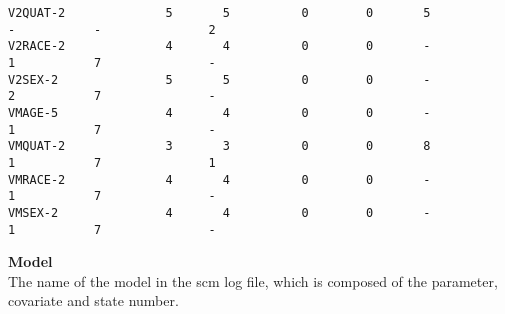 \documentclass[hideglossary,notoc,hidelof,hidelot,hideTheSignaturePage,hideLinkCurrent,hideloa,pdfLatex,noClient,notitle,hideConfidential]{PMXstyle-20170118kajsa4}
\begin{document}
{\begin{verbatim}
V2QUAT-2              5       5          0        0       5           -           -               2
V2RACE-2              4       4          0        0       -           1           7               -
V2SEX-2               5       5          0        0       -           2           7               -
VMAGE-5               4       4          0        0       -           1           7               -
VMQUAT-2              3       3          0        0       8           1           7               1
VMRACE-2              4       4          0        0       -           1           7               -
VMSEX-2               4       4          0        0       -           1           7               -
\end{verbatim}
}


{\bfseries Model}\\
The name of the model in the scm log file, which is composed of the parameter, covariate and state number.


\end{document}
